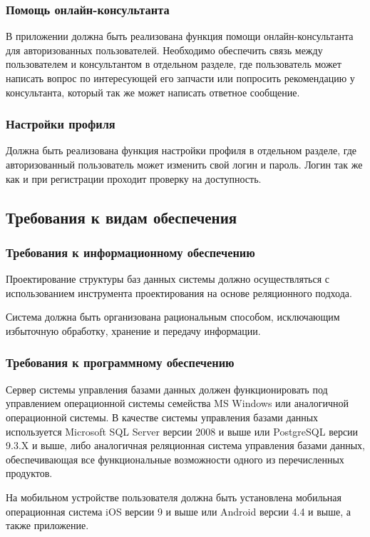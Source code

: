 \documentclass[14pt]{extreport}
\begin{document}
\subsubsection{Помощь онлайн-консультанта}
В приложении должна быть реализована функция помощи онлайн-консультанта для авторизованных пользователей. Необходимо обеспечить связь между пользователем и консультантом в отдельном разделе, где пользователь может написать вопрос по интересующей его запчасти или попросить рекомендацию у консультанта, который так же может написать ответное сообщение. 
 
\subsubsection{Настройки профиля}
Должна быть реализована функция настройки профиля в отдельном разделе, где авторизованный пользователь может изменить свой логин и пароль. Логин так же как и при регистрации проходит проверку на доступность.


\subsection{Требования к видам обеспечения}

\subsubsection{Требования к информационному обеспечению}
Проектирование структуры баз данных системы должно осуществляться с использованием инструмента проектирования на основе реляционного подхода.

Система должна быть организована рациональным способом, исключающим избыточную обработку, хранение и передачу информации.

\subsubsection{Требования к программному обеспечению}
Сервер системы управления базами данных должен функционировать под управлением операционной системы семейства MS Windows или аналогичной операционной системы. В качестве системы управления базами данных  используется Microsoft SQL Server версии 2008 и выше или PostgreSQL версии 9.3.X и выше, либо аналогичная реляционная система управления базами данных, обеспечивающая все функциональные возможности одного из перечисленных продуктов.

На мобильном устройстве пользователя должна быть установлена мобильная операционная система iOS версии 9 и выше или Android версии 4.4 и выше, а также приложение. 
\end{document}
